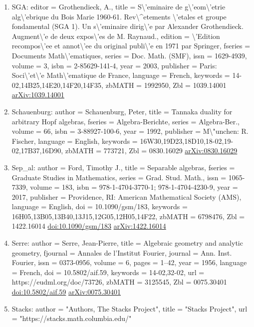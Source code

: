 \documentclass[11pt]{article}
\begin{document}
\begin{enumerate}[leftmargin=*]
  \item SGA: editor = Grothendieck, A., title = S\textbackslash{}'eminaire de g\textbackslash{}'eom\textbackslash{}'etrie alg\textbackslash{}'ebrique du Bois Marie 1960-61. Rev\textbackslash{}\^{}etements \textbackslash{}'etales et groupe fondamental (SGA 1). Un s\textbackslash{}'eminaire dirig\textbackslash{}'e par Alexander Grothendieck. Augment\textbackslash{}'e de deux expos\textbackslash{}'es de M. Raynaud., edition = \textbackslash{}'Edition recompos\textbackslash{}'ee et annot\textbackslash{}'ee du original publi\textbackslash{}'e en 1971 par Springer, fseries = Documents Math\textbackslash{}'ematiques, series = Doc. Math. (SMF), issn = 1629-4939, volume = 3, isbn = 2-85629-141-4, year = 2003, publisher = Paris: Soci\textbackslash{}'et\textbackslash{}'e Math\textbackslash{}'ematique de France, language = French, keywords = 14-02,14B25,14E20,14F20,14F35, zbMATH = 1992950, Zbl = 1039.14001 \href{https://arxiv.org/abs/1039.14001}{arXiv:1039.14001}
  \item Schauenburg: author = Schauenburg, Peter, title = Tannaka duality for arbitrary Hopf algebras, fseries = Algebra-Berichte, series = Algebra-Ber., volume = 66, isbn = 3-88927-100-6, year = 1992, publisher = M\textbackslash{}"unchen: R. Fischer, language = English, keywords = 16W30,19D23,18D10,18-02,19-02,17B37,16D90, zbMATH = 773721, Zbl = 0830.16029 \href{https://arxiv.org/abs/0830.16029}{arXiv:0830.16029}
  \item Sep\_al: author = Ford, Timothy J., title = Separable algebras, fseries = Graduate Studies in Mathematics, series = Grad. Stud. Math., issn = 1065-7339, volume = 183, isbn = 978-1-4704-3770-1; 978-1-4704-4230-9, year = 2017, publisher = Providence, RI: American Mathematical Society (AMS), language = English, doi = 10.1090/gsm/183, keywords = 16H05,13B05,13B40,13J15,12G05,12H05,14F22, zbMATH = 6798476, Zbl = 1422.16014 \href{https://doi.org/10.1090/gsm/183}{doi:10.1090/gsm/183} \href{https://arxiv.org/abs/1422.16014}{arXiv:1422.16014}
  \item Serre: author = Serre, Jean-Pierre, title = Algebraic geometry and analytic geometry, fjournal = Annales de l'Institut Fourier, journal = Ann. Inst. Fourier, issn = 0373-0956, volume = 6, pages = 1--42, year = 1956, language = French, doi = 10.5802/aif.59, keywords = 14-02,32-02, url = https://eudml.org/doc/73726, zbMATH = 3125545, Zbl = 0075.30401 \href{https://doi.org/10.5802/aif.59}{doi:10.5802/aif.59} \href{https://arxiv.org/abs/0075.30401}{arXiv:0075.30401}
  \item Stacks: author = "Authors, The Stacks Project", title = "Stacks Project", url = "https://stacks.math.columbia.edu/"

\end{enumerate}
\end{document}
